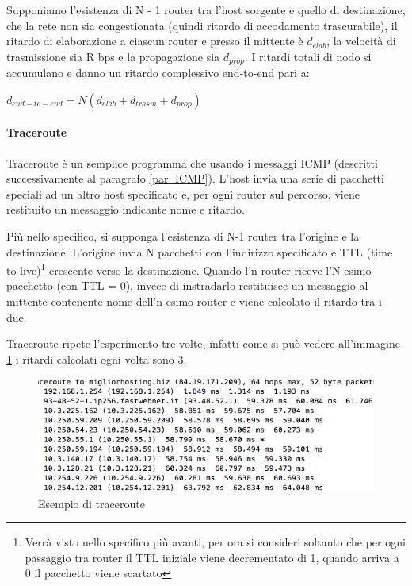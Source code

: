 \documentclass[11pt,a4paper]{book}
\begin{document}
Supponiamo l'esistenza di N - 1 router tra l'host sorgente e quello di destinazione, che la rete non sia congestionata (quindi ritardo di accodamento trascurabile), il ritardo di elaborazione a ciascun router e presso il mittente è $d_{elab}$, la velocità di trasmissione sia R bps e la propagazione sia $d_{prop}$. I ritardi totali di nodo si accumulano e danno un ritardo complessivo end-to-end pari a:
\begin{center}
	$d_{end-to-end} = N(d_{elab} + d_{trasm} + d_{prop})$
\end{center}

\paragraph{Traceroute}
Traceroute è un semplice programma che usando i messaggi ICMP (descritti successivamente al paragrafo \ref{par: ICMP}). L'host invia una serie di pacchetti speciali ad un altro host specificato e, per ogni router sul percorso, viene restituito un messaggio indicante nome e ritardo.

Più nello specifico, si supponga l'esistenza di N-1 router tra l'origine e la destinazione. L'origine invia N pacchetti con l'indirizzo specificato e TTL (time to live)\footnote{Verrà visto nello specifico più avanti, per ora si consideri soltanto che per ogni passaggio tra router il TTL iniziale viene decrementato di 1, quando arriva a 0 il pacchetto viene scartato} crescente verso la destinazione. Quando l'n-router riceve l'N-esimo pacchetto (con TTL = 0), invece di instradarlo restituisce un messaggio al mittente contenente nome dell'n-esimo router e viene calcolato il ritardo tra i due.

Traceroute ripete l'esperimento tre volte, infatti come si può vedere all'immagine \ref{fig: 083} i ritardi calcolati ogni volta sono 3.
\begin{figure}
	\begin{center}
		\includegraphics[scale=1]{img/083.png}
		\caption{Esempio di traceroute}
		\label{fig: 083}
	\end{center} 
\end{figure}
\end{document}
